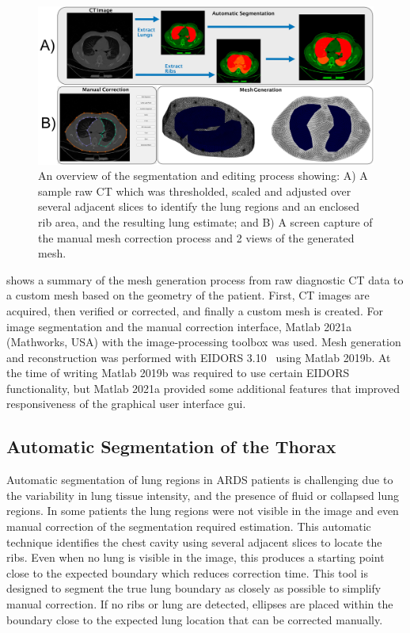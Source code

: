 \begin{figure}
	\centering
	\includegraphics[width=\textwidth]{chapter5-CT_to_mesh/imgs/methods_figure.pdf}
	\caption[Mesh generation method overiew.]{\label{fig:segment_overview}%
	An overview of the segmentation and editing process showing: 
	A) A sample raw CT which was thresholded, scaled and adjusted over several 
	adjacent slices to identify
	the lung regions and an enclosed rib area, and the resulting lung estimate; and
	B) A screen  capture of the manual mesh correction process and 2 views of the generated
	mesh.
	}
\end{figure}

 shows a summary of the mesh generation process from raw diagnostic CT 
data to a custom mesh based on the geometry of the patient.
First, CT images are acquired, then verified or corrected, and finally a custom mesh is created.
For image segmentation and the manual correction interface,
Matlab 2021a (Mathworks, USA) with the 
image-processing toolbox was used.
Mesh generation and reconstruction was performed with 
EIDORS 3.10~\parencite{adler_eidors_2017} using Matlab 2019b.
At the time of writing Matlab 2019b was required to 
use certain EIDORS functionality, but Matlab 2021a provided some additional 
features that improved responsiveness of the 
graphical user interface \acrshort{gui}.

\subsection{Automatic Segmentation of the Thorax} \label{sec:auto-segment}
Automatic segmentation of lung regions in ARDS patients is challenging due to the variability
in lung tissue intensity, and the presence of fluid or collapsed lung regions. 
In some patients the lung regions were not visible in the image and even manual
correction of the segmentation required estimation. 
This automatic technique identifies the chest cavity using several adjacent slices to
locate the ribs.
Even when no lung is visible in the image, this produces a starting point
close to the expected boundary which reduces correction time. 
This tool is designed to segment the true lung boundary as closely as possible to 
simplify manual correction.
If no ribs or lung are detected, ellipses are placed within the boundary 
close to the expected lung location that 
can be corrected manually.


